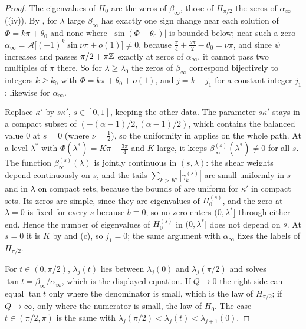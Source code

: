 \begin{proof}
 The eigenvalues of $H_0$ are the zeros of $\beta_\infty$, those of $H_{\pi/2}$
the zeros of $\alpha_\infty$ ((iv)). By , for $\lambda$ large
$\beta_\infty$ has exactly one sign change near each solution of $\Phi=k\pi+\theta_0$ and none
where $|\sin(\Phi-\theta_0)|$ is bounded below; near such a zero
$\alpha_\infty=\mathcal A\bigl[(-1)^k\sin\nu\pi+o(1)\bigr]\neq0$, because
$\frac\pi4+\frac{\nu\pi}2-\theta_0=\nu\pi$, and since $\psi$ increases and passes
$\pi/2+\pi\mathbb{Z}$ exactly at zeros of $\alpha_\infty$, it cannot pass two multiples of $\pi$
there. So for $\lambda\ge\lambda_0$ the zeros of $\beta_\infty$ correspond bijectively to
integers $k\ge k_0$ with $\Phi=k\pi+\theta_0+o(1)$, and $j=k+j_1$ for a constant integer
$j_1$; likewise for $\alpha_\infty$.

 Replace $\kappa'$ by $s\kappa'$, $s\in[0,1]$, keeping the other data. The parameter
$s\kappa'$ stays in a compact subset of $(-(\alpha-1)/2,(\alpha-1)/2)$, which contains the balanced value
$0$ at $s=0$ (where $\nu=\frac12$), so the uniformity in  applies on the whole path. At a
level $\lambda^*$ with $\Phi(\lambda^*)=K\pi+\frac{3\pi}4$ and $K$ large, it keeps
$\beta^{(s)}_\infty(\lambda^*)\ne0$ for all $s$. The function $\beta^{(s)}_\infty(\lambda)$ is jointly continuous
in $(s,\lambda)$: the shear weights depend continuously on $s$, and the tails $\sum_{k>K'}|\gamma^{(s)}_k|$ are
small uniformly in $s$ and in $\lambda$ on compact sets, because the bounds of  are
uniform for $\kappa'$ in compact sets. Its zeros are simple, since they are eigenvalues of $H_0^{(s)}$,
and the zero at $\lambda=0$ is fixed for every $s$ because $b\equiv0$; so no zero enters $(0,\lambda^*]$
through either end. Hence the number of eigenvalues of $H^{(s)}_0$ in $(0,\lambda^*]$ does not depend
on $s$. At $s=0$ it is $K$ by  and
(c), so $j_1=0$; the same argument with $\alpha_\infty$ fixes the labels of
$H_{\pi/2}$.

 For $t\in(0,\pi/2)$, $\lambda_j(t)$ lies between $\lambda_j(0)$ and
$\lambda_j(\pi/2)$ and solves $\tan t=\beta_\infty/\alpha_\infty$, which is the displayed equation. If
$Q\to0$ the right side can equal $\tan t$ only where the denominator is small, which is
the law of $H_{\pi/2}$; if $Q\to\infty$, only where the numerator is small, the law of
$H_0$. The case $t\in(\pi/2,\pi)$ is the same with $\lambda_j(\pi/2)<\lambda_j(t)<\lambda_{j+1}(0)$.
\end{proof}

